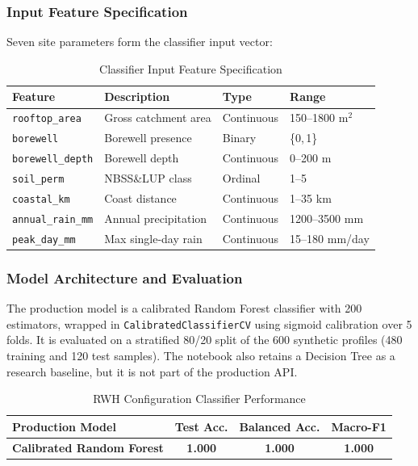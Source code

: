 ﻿\documentclass[conference]{IEEEtran}
\begin{document}
\subsubsection{Input Feature Specification}
Seven site parameters form the classifier input vector:

\begin{table}[htbp]
\caption{Classifier Input Feature Specification}
\begin{center}
\begin{tabular}{lp{2.6cm}ll}
\toprule
\textbf{Feature} & \textbf{Description} & \textbf{Type} & \textbf{Range} \\
\midrule
\texttt{rooftop\_area}    & Gross catchment area & Continuous & 150--1800 m$^2$ \\
\texttt{borewell}         & Borewell presence    & Binary     & \{0,\,1\}       \\
\texttt{borewell\_depth}  & Borewell depth       & Continuous & 0--200 m        \\
\texttt{soil\_perm}       & NBSS\&LUP class      & Ordinal    & 1--5            \\
\texttt{coastal\_km}      & Coast distance       & Continuous & 1--35 km        \\
\texttt{annual\_rain\_mm} & Annual precipitation & Continuous & 1200--3500 mm   \\
\texttt{peak\_day\_mm}    & Max single-day rain  & Continuous & 15--180 mm/day  \\
\bottomrule
\end{tabular}
\label{tab:features}
\end{center}
\end{table}

\subsubsection{Model Architecture and Evaluation}
The production model is a calibrated Random Forest classifier with 200 estimators, wrapped in \texttt{CalibratedClassifierCV} using sigmoid calibration over 5 folds. It is evaluated on a stratified 80/20 split of the 600 synthetic profiles (480 training and 120 test samples). The notebook also retains a Decision Tree as a research baseline, but it is not part of the production API.

\begin{table}[htbp]
\caption{RWH Configuration Classifier Performance}
\begin{center}
\begin{tabular}{lccc}
\toprule
\textbf{Production Model} & \textbf{Test Acc.} & \textbf{Balanced Acc.} & \textbf{Macro-F1} \\
\midrule
\textbf{Calibrated Random Forest} & \textbf{1.000} & \textbf{1.000} & \textbf{1.000} \\
\bottomrule
\end{tabular}
\label{tab:classifier}
\end{center}
\end{table}
\end{document}
